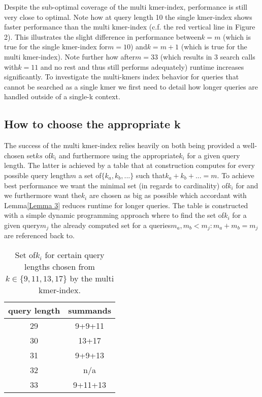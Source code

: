 Despite the sub-optimal coverage of the multi kmer-index, performance
is still very close to optimal. Note how at query length 10 the single
kmer-index shows faster performance than the multi kmer-index (c.f.
the red vertical line in Figure 2). This illustrates the slight difference
in performance between$k=m$ (which is true for the single kmer-index
for$m=10$) and$k=m+1$ (which is true for the multi kmer-index).
Note further how after$m=33$ (which results in 3 search calls with$k=11$
and no rest and thus still performs adequately) runtime increases
significantly. To investigate the multi-kmers index behavior for queries
that cannot be searched as a single kmer we first need to detail how
longer queries are handled outside of a single-k context.

\subsection{\label{section 4.2}How to choose the appropriate k}

The success of the multi kmer-index relies heavily on both being provided
a well-chosen set$ks$ of$k_{i}$ and furthermore using the appropriate$k_{i}$
for a given query length. The latter is achieved by a table that at
construction computes for every possible query length$m$ a set of$\{k_{a},k_{b},...\}$
such that$k_{a}+k_{b}+...=m$. To achieve best performance we want
the minimal set (in regards to cardinality) of$k_{i}$ for and we
furthermore want the$k_{i}$ are chosen as big as possible which accordant
with Lemma\ref{Lemma 3} reduces runtime for longer queries. The table
is constructed with a simple dynamic programming approach where to
find the set of$k_{i}$ for a given query$m_{j}$ the already computed
set for a queries$m_{a},m_{b}<m_{j}:m_{a}+m_{b}=m_{j}$ are referenced
back to.

\begin{table}[H]
\centering{}\caption{Set of$k_{i}$ for certain query lengths chosen from$k\in\{9,11,13,17\}$
by the multi kmer-index.}
\begin{tabular}{cc}
\toprule
query length & summands\tabularnewline
\midrule
\midrule
29 & 9+9+11\tabularnewline
\midrule
30 & 13+17\tabularnewline
\midrule
31 & 9+9+13\tabularnewline
\midrule
32 & n/a\tabularnewline
\midrule
33 & 9+11+13\tabularnewline
\bottomrule
\end{tabular}
\end{table}

